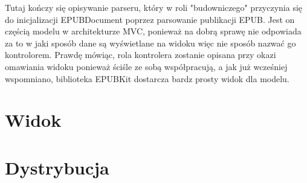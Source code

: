 Tutaj kończy się opisywanie parseru, który w roli "budowniczego" przyczynia się do inicjalizacji EPUBDocument poprzez parsowanie publikacji EPUB. Jest on częścią modelu w architekturze MVC, ponieważ na dobrą sprawę nie odpowiada za to w jaki sposób dane są wyświetlane na widoku więc nie sposób nazwać go kontrolorem. Prawdę mówiąc, rola kontrolera zostanie opisana przy okazi omawiania widoku ponieważ ściśle ze sobą współpracują, a jak już wcześniej wspomniano, biblioteka EPUBKit dostarcza bardz prosty widok dla modelu.

\section{Widok}
\section{Dystrybucja}

